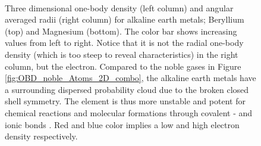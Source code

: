 \begin{figure}
\begin{center}
     \\
  \caption{Three dimensional one-body density (left column) and angular averaged radii (right column) for alkaline earth metals; Beryllium (top) and Magnesium (bottom). The color bar shows increasing values from left to right. Notice that it is not the radial one-body density (which is too steep to reveal characteristics) in the right column, but the electron. Compared to the noble gases in Figure \ref{fig:OBD_noble_Atoms_2D_combo}, the alkaline earth metals have a surrounding dispersed probability cloud due to the broken closed shell symmetry. The element is thus more unstable and potent for chemical reactions and molecular formations through covalent - and ionic bonds \cite{UniversityPhysics}. Red and blue color implies a low and high electron density respectively.}
  \label{fig:OBD_alkaline_Atoms_2D_combo}
 \end{center}
\end{figure}
 
